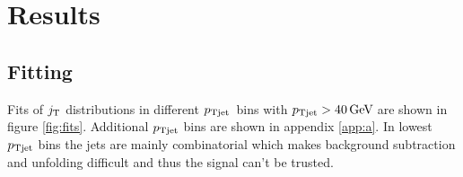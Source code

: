 \FloatBarrier
\section{Results}
\label{sec:exp}



%









\subsection{Fitting}
Fits of $j_{\rm T}$ distributions in different $p_{\rm Tjet}$ bins with $\pt{jet}  > \unit[40]{\gev}$ are shown in figure \ref{fig:fits}. Additional $p_{\rm Tjet}$ bins are shown in appendix \ref{app:a}. In lowest $p_{\rm Tjet}$ bins the jets are mainly combinatorial which makes background subtraction and unfolding difficult and thus the signal can't be trusted. 

